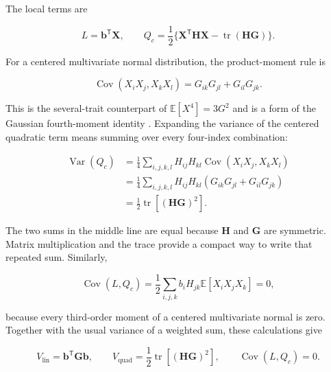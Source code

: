 \documentclass[11pt]{article}
\newcommand{\vect}[1]{\boldsymbol{#1}}
\newcommand{\mat}[1]{\mathbf{#1}}
\newcommand{\E}{\mathbb{E}}
\newcommand{\Var}{\operatorname{Var}}
\newcommand{\Cov}{\operatorname{Cov}}
\newcommand{\tr}{\operatorname{tr}}
\newcommand{\Vlin}{\ensuremath{V_{\mathrm{lin}}}}
\newcommand{\Vquad}{\ensuremath{V_{\mathrm{quad}}}}
\begin{document}
The local terms are

\begin{equation}
L=\vect b^{\mathsf T}\vect X,
\qquad
Q_c=\frac12\{\vect X^{\mathsf T}\mat H\vect X-
\tr(\mat H\mat G)\}.
\end{equation}

For a centered multivariate normal distribution, the product-moment rule is

\begin{equation}
\Cov(X_iX_j,X_kX_l)=G_{ik}G_{jl}+G_{il}G_{jk}.
\end{equation}

This is the several-trait counterpart of $\E[X^4]=3G^2$ and is a form of the
Gaussian fourth-moment identity \citep{Isserlis1918}.  Expanding the variance
of the centered quadratic term means summing over every four-index
combination:

\begin{align}
\Var(Q_c)
&=\frac14\sum_{i,j,k,l}H_{ij}H_{kl}
\Cov(X_iX_j,X_kX_l)\nonumber\\
&=\frac14\sum_{i,j,k,l}H_{ij}H_{kl}
(G_{ik}G_{jl}+G_{il}G_{jk})\nonumber\\
&=\frac12\tr[(\mat H\mat G)^2].
\label{eq:guide-trace-reduction}
\end{align}

The two sums in the middle line are equal because $\mat H$ and $\mat G$ are
symmetric.  Matrix multiplication and the trace provide a compact way to
write that repeated sum.  Similarly,

\begin{equation}
\Cov(L,Q_c)=\frac12\sum_{i,j,k}b_iH_{jk}
\E[X_iX_jX_k]=0,
\end{equation}

because every third-order moment of a centered multivariate normal is zero.
Together with the usual variance of a weighted sum, these calculations give

\begin{equation}
\Vlin=\vect b^{\mathsf T}\mat G\vect b,
\qquad
\Vquad=\frac12\tr[(\mat H\mat G)^2],
\qquad
\Cov(L,Q_c)=0.
\label{eq:guide-multi-variances}
\end{equation}
\end{document}
